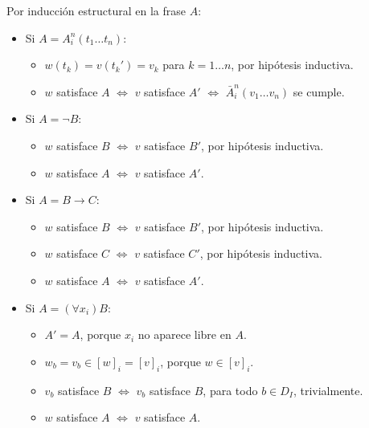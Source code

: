 \begin{prove}
Por inducción estructural en la frase $A$:

\begin{itemize}
    \item Si $A = A_i^n(t_1 \dots t_n)$:
    \begin{itemize}
        \item $w(t_k) = v(t_k') = v_k$ para $k = 1 \dots n$, por hipótesis inductiva.
        \item $w$ satisface $A$ $\iff$ $v$ satisface $A'$ $\iff$ $\bar A_i^n(v_1 \dots v_n)$ se cumple.
    \end{itemize}
    
    \item Si $A = \neg B$:
    \begin{itemize}
        \item $w$ satisface $B$ $\iff$ $v$ satisface $B'$, por hipótesis inductiva.
        \item $w$ satisface $A$ $\iff$ $v$ satisface $A'$.
    \end{itemize}
    
    \item Si $A = B \to C$:
    \begin{itemize}
        \item $w$ satisface $B$ $\iff$ $v$ satisface $B'$, por hipótesis inductiva.
        \item $w$ satisface $C$ $\iff$ $v$ satisface $C'$, por hipótesis inductiva.
        \item $w$ satisface $A$ $\iff$ $v$ satisface $A'$.
    \end{itemize}
    
    \item Si $A = (\forall x_i) B$:
    \begin{itemize}
        \item $A' = A$, porque $x_i$ no aparece libre en $A$.
        \item $w_b = v_b \in [w]_i = [v]_i$, porque $w \in [v]_i$.
        \item $v_b$ satisface $B$ $\iff$ $v_b$ satisface $B$, para todo $b \in D_I$, trivialmente.
        \item $w$ satisface $A$ $\iff$ $v$ satisface $A$.
    \end{itemize}
    

\end{itemize}
\end{prove}
